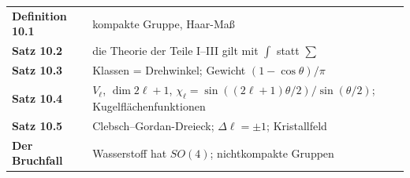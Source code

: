 \begin{merksatz}
\begin{center}
\renewcommand{\arraystretch}{1.5}
\begin{tabular}{@{}P{3.0cm}P{5.6cm}@{}}
\toprule
\textbf{Definition 10.1} & kompakte Gruppe, Haar-Maß\\
\textbf{Satz 10.2} & die Theorie der Teile I--III gilt mit $\int$ statt $\sum$\\
\textbf{Satz 10.3} & Klassen = Drehwinkel; Gewicht $(1 - \cos\theta)/\pi$\\
\textbf{Satz 10.4} & $V_\ell$, $\dim 2\ell + 1$, $\chi_\ell = \sin((2\ell + 1)\theta/2)/\sin(\theta/2)$; Kugelflächenfunktionen\\
\textbf{Satz 10.5} & Clebsch--Gordan-Dreieck; $\Delta\ell = \pm1$; Kristallfeld\\
\textbf{Der Bruchfall} & Wasserstoff hat $SO(4)$; nichtkompakte Gruppen\\
\bottomrule
\end{tabular}
\end{center}

\begin{center}
\begin{minipage}{0.88\textwidth}
\end{minipage}
\end{center}
\end{merksatz}
